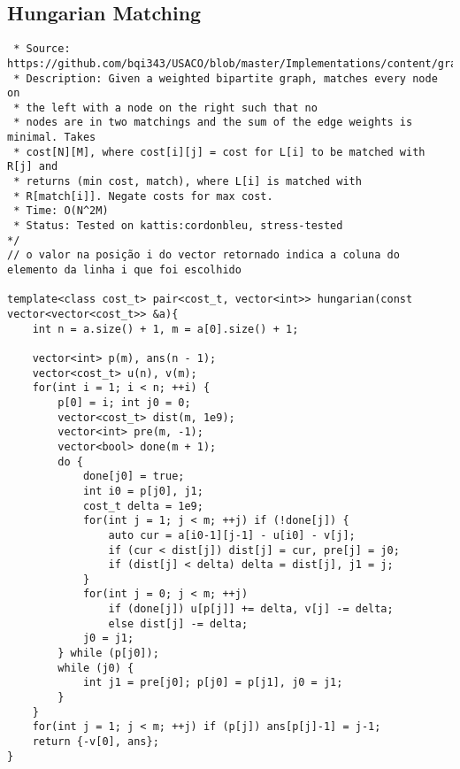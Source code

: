\documentclass[11pt, a4paper, twoside]{article}
\begin{document}
\subsection{Hungarian Matching}
\begin{verbatim}
 * Source: https://github.com/bqi343/USACO/blob/master/Implementations/content/graphs%20(12)/Matching/Hungarian.h
 * Description: Given a weighted bipartite graph, matches every node on
 * the left with a node on the right such that no
 * nodes are in two matchings and the sum of the edge weights is minimal. Takes
 * cost[N][M], where cost[i][j] = cost for L[i] to be matched with R[j] and
 * returns (min cost, match), where L[i] is matched with
 * R[match[i]]. Negate costs for max cost.
 * Time: O(N^2M)
 * Status: Tested on kattis:cordonbleu, stress-tested
*/
// o valor na posição i do vector retornado indica a coluna do elemento da linha i que foi escolhido

template<class cost_t> pair<cost_t, vector<int>> hungarian(const vector<vector<cost_t>> &a){
    int n = a.size() + 1, m = a[0].size() + 1;
        
    vector<int> p(m), ans(n - 1);
    vector<cost_t> u(n), v(m); 
	for(int i = 1; i < n; ++i) { 
		p[0] = i; int j0 = 0;
		vector<cost_t> dist(m, 1e9);  
        vector<int> pre(m, -1); 
		vector<bool> done(m + 1);   
		do {
			done[j0] = true;
			int i0 = p[j0], j1; 
            cost_t delta = 1e9;
			for(int j = 1; j < m; ++j) if (!done[j]) {
				auto cur = a[i0-1][j-1] - u[i0] - v[j];
				if (cur < dist[j]) dist[j] = cur, pre[j] = j0;
				if (dist[j] < delta) delta = dist[j], j1 = j;
			}
			for(int j = 0; j < m; ++j)
				if (done[j]) u[p[j]] += delta, v[j] -= delta;
				else dist[j] -= delta;
			j0 = j1;
		} while (p[j0]);
		while (j0) { 
			int j1 = pre[j0]; p[j0] = p[j1], j0 = j1;
		}
	}
	for(int j = 1; j < m; ++j) if (p[j]) ans[p[j]-1] = j-1;
	return {-v[0], ans}; 
}
\end{verbatim}
\end{document}
